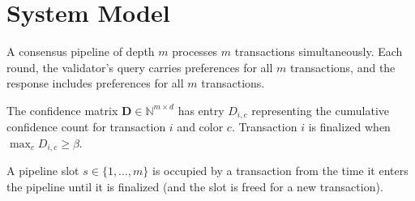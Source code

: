 \section{System Model}

\label{sec:photon-model}

\begin{definition}[Pipeline]
A consensus pipeline of depth $m$ processes $m$ transactions simultaneously. Each
round, the validator's query carries preferences for all $m$ transactions, and the
response includes preferences for all $m$ transactions.
\end{definition}

\begin{definition}
The confidence matrix $\mathbf{D} \in \mathbb{N}^{m \times d}$ has entry $D_{i,c}$
representing the cumulative confidence count for transaction $i$ and color $c$.
Transaction $i$ is finalized when $\max_c D_{i,c} \geq \beta$.
\end{definition}

\begin{definition}
A pipeline slot $s \in \{1, \ldots, m\}$ is occupied by a transaction from the time
it enters the pipeline until it is finalized (and the slot is freed for a new transaction).
\end{definition}


